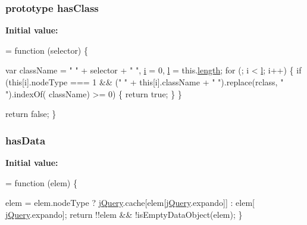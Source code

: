 \subsubsection[{\texorpdfstring{has\+Class}{hasClass}}]{ {\bf prototype} has\+Class}\hypertarget{jquery-2_82_81-vsdoc_8js_a8a4b3bae3851e6836fad6374ebac2bfe}{}\label{jquery-2_82_81-vsdoc_8js_a8a4b3bae3851e6836fad6374ebac2bfe}
{\bfseries Initial value\+:}
\begin{DoxyCode}
= \textcolor{keyword}{function} (selector) \{
        

        var className = \textcolor{stringliteral}{" "} + selector + \textcolor{stringliteral}{" "},
            \hyperlink{geolocation-marker_8js_a0325b7ce0988782a8032e720ef3aa411}{i} = 0,
            \hyperlink{geolocation-marker_8js_ae5e71a2600e8891c54854be157cc6626}{l} = this.\hyperlink{jquery-2_82_81-vsdoc_8js_aa7de35d58da66d9944ab9cbe82c19640}{length};
        \textcolor{keywordflow}{for} (; i < \hyperlink{geolocation-marker_8js_ae5e71a2600e8891c54854be157cc6626}{l}; i++) \{
            \textcolor{keywordflow}{if} (\textcolor{keyword}{this}[i].nodeType === 1 && (\textcolor{stringliteral}{" "} + \textcolor{keyword}{this}[i].className + \textcolor{stringliteral}{" "}).replace(rclass, \textcolor{stringliteral}{" "}).indexOf(
      className) >= 0) \{
                \textcolor{keywordflow}{return} \textcolor{keyword}{true};
            \}
        \}

        \textcolor{keywordflow}{return} \textcolor{keyword}{false};
    \}
\end{DoxyCode}
\subsubsection[{\texorpdfstring{has\+Data}{hasData}}]{ has\+Data}\hypertarget{jquery-2_82_81-vsdoc_8js_ae295a27c2f07b73f73ec6e43b4a0eb88}{}\label{jquery-2_82_81-vsdoc_8js_ae295a27c2f07b73f73ec6e43b4a0eb88}
{\bfseries Initial value\+:}
\begin{DoxyCode}
= \textcolor{keyword}{function} (elem) \{
        

        elem = elem.nodeType ? \hyperlink{jquery-2_82_81-vsdoc_8js_add5237586d970a38a81f990e8eb28c6c}{jQuery}.cache[elem[\hyperlink{jquery-2_82_81-vsdoc_8js_add5237586d970a38a81f990e8eb28c6c}{jQuery}.expando]] : elem[
      \hyperlink{jquery-2_82_81-vsdoc_8js_add5237586d970a38a81f990e8eb28c6c}{jQuery}.expando];
        \textcolor{keywordflow}{return} !!elem && !isEmptyDataObject(elem);
    \}
\end{DoxyCode}

